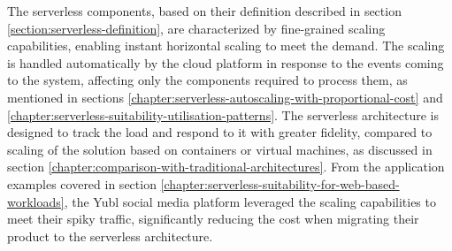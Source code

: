 The serverless components, based on their definition described in section \ref{section:serverless-definition}, are characterized by fine-grained scaling capabilities, enabling instant horizontal scaling to meet the demand.
The scaling is handled automatically by the cloud platform in response to the events coming to the system, affecting only the components required to process them, as mentioned in sections \ref{chapter:serverless-autoscaling-with-proportional-cost} and \ref{chapter:serverless-suitability-utilisation-patterns}.
The serverless architecture is designed to track the load and respond to it with greater fidelity, compared to scaling of the solution based on containers or virtual machines, as discussed in section \ref{chapter:comparison-with-traditional-architectures}.
From the application examples covered in section \ref{chapter:serverless-suitability-for-web-based-workloads}, the Yubl social media platform leveraged the scaling capabilities to meet their spiky traffic, significantly reducing the cost when migrating their product to the serverless architecture.



